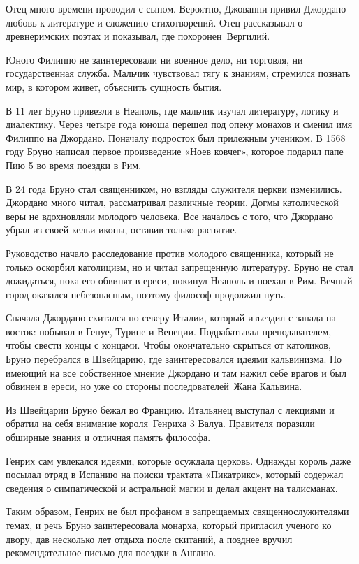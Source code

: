 \documentclass[
]{article}
\begin{document}
Отец много времени проводил с сыном. Вероятно, Джованни привил Джордано
любовь к литературе и сложению стихотворений. Отец рассказывал о
древнеримских поэтах и показывал, где похоронен~Вергилий.

Юного Филиппо не заинтересовали ни военное дело, ни торговля, ни
государственная служба. Мальчик чувствовал тягу к знаниям, стремился
познать мир, в котором живет, объяснить сущность бытия.

В 11 лет Бруно привезли в Неаполь, где мальчик изучал литературу, логику
и диалектику. Через четыре года юноша перешел под опеку монахов и сменил
имя Филиппо на Джордано. Поначалу подросток был прилежным учеником. В
1568 году Бруно написал первое произведение «Ноев ковчег», которое
подарил папе Пию 5 во время поездки в Рим.

В 24 года Бруно стал священником, но взгляды служителя церкви
изменились. Джордано много читал, рассматривал различные теории. Догмы
католической веры не вдохновляли молодого человека. Все началось с того,
что Джордано убрал из своей кельи иконы, оставив только распятие.

Руководство начало расследование против молодого священника, который не
только оскорбил католицизм, но и читал запрещенную литературу. Бруно не
стал дожидаться, пока его обвинят в ереси, покинул Неаполь и поехал в
Рим. Вечный город оказался небезопасным, поэтому философ продолжил путь.

Сначала Джордано скитался по северу Италии, который изъездил с запада на
восток: побывал в Генуе, Турине и Венеции. Подрабатывал преподавателем,
чтобы свести концы с концами. Чтобы окончательно скрыться от католиков,
Бруно перебрался в Швейцарию, где заинтересовался идеями кальвинизма. Но
имеющий на все собственное мнение Джордано и там нажил себе врагов и был
обвинен в ереси, но уже со стороны последователей~Жана Кальвина.

Из Швейцарии Бруно бежал во Францию. Итальянец выступал с лекциями и
обратил на себя внимание короля~Генриха 3 Валуа. Правителя поразили
обширные знания и отличная память философа.

Генрих сам увлекался идеями, которые осуждала церковь. Однажды король
даже посылал отряд в Испанию на поиски трактата «Пикатрикс», который
содержал сведения о симпатической и астральной магии и делал акцент на
талисманах.

Таким образом, Генрих не был профаном в запрещаемых священнослужителями
темах, и речь Бруно заинтересовала монарха, который пригласил ученого ко
двору, дав несколько лет отдыха после скитаний, а позднее вручил
рекомендательное письмо для поездки в Англию.
\end{document}
